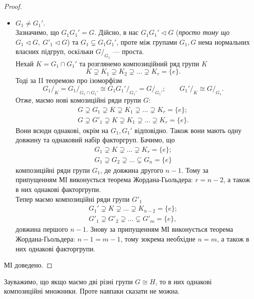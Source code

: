 \documentclass{math_library}
\begin{document}
\begin{proof}
\begin{enumerate}[nosep,wide=0pt,label={\Roman*.}]
\begin{itemize}[wide=0pt]
\item $G_1 \neq G_1'$. \\
Зазначимо, що $G_1  G_1' = G$. Дійсно, в нас $G_1 G_1' \triangleleft G$ (\textit{просто тому що $G_1 \triangleleft G,\ G'_1 \triangleleft G$}) та $G_1 \subsetneq G_1 G_1'$, проте між групами $G_1,G$ нема нормальних власних підгруп, оскільки $G/_{G_1}$ --- проста.\\
Нехай $K = G_1 \cap G_1'$ та розглянемо композиційний ряд групи $K$ 
\[
K \supsetneq K_1 \supsetneq K_2 \supsetneq \dots \supsetneq K_r = \{e\}.
\]
Тоді за II теоремою про ізоморфізм
\[
{G_1}/_K = {G_1}/_{G_1 \cap G_1'} \cong {G_1 G_1'}/_{G_1'} = G/_{G_1'}; \qquad {G_1'}/_K \cong G/_{G_1}.
\]
Отже, маємо нові комозиційні ряди групи $G$:
\begin{align*}
G \supsetneq G_1 \supsetneq K \supsetneq K_1 \supsetneq \dots \supsetneq K_r = \{e\};\\
G \supsetneq G'_1 \supsetneq K \supsetneq K_1 \supsetneq \dots \supsetneq K_r = \{e\}.
\end{align*}
Вони всюди однакові, окрім на $G_1,G_1'$ відповідно. Також вони мають одну довжину та однаковий набір факторгруп. Бачимо, що
\begin{align*}
G_1 \supsetneq K \supsetneq \dots \supsetneq K_r = \{e\};\\
G_1 \supsetneq G_2 \supsetneq \dots \subsetneq G_n = \{e\}
\end{align*}
композиційні ряди групи $G_1$, де довжина другого $n-1$. Тому за припущенням МІ виконується теорема Жордана-Гьольдера: $r = n-2$, а також в них однакові факторгрупи.\\
Тепер маємо композиційні ряди групи $G'_1$
\begin{align*}
G_1' \supsetneq K \supsetneq \dots \supsetneq K_{n-2} = \{e\}; \\
G'_1 \supsetneq G'_2 \supsetneq \dots \subsetneq G'_m = \{e\},
\end{align*}
довжина першого $n-1$. Знову за припущенням МІ виконується теорема Жордана-Гьольдера: $n-1 = m-1$, тому зокрема необхідне $n = m$, а також в них однакові факторгрупи.
\end{itemize}
\end{enumerate}
МІ доведено.
\end{proof}

\begin{remark}
Зауважимо, що якщо маємо дві різні групи $G \cong H$, то в них однакові композиційні множники. Проте навпаки сказати не можна.
\end{remark}
\end{document}
